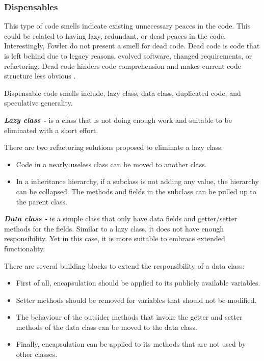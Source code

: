 \subsubsection*{Dispensables}
This type of code smells indicate existing unnecessary peaces in the code. This could be related to having lazy, redundant, or dead peaces in the code. Interestingly, Fowler \cite{fowlerRefactor} do not present a smell for dead code. Dead code is code that is left behind due to legacy reasons, evolved software, changed requirements, or refactoring. Dead code hinders code comprehension and makes current code structure less obvious \cite{mantylaTaxonomy}.

Dispensable code smells include, lazy class, data class, duplicated code, and speculative generality.

\textit{\textbf{Lazy class -}} is a class that is not doing enough work and suitable to be eliminated with a short effort. 

There are two refactoring solutions proposed to eliminate a lazy class:

\begin{itemize}
\item Code in a nearly useless class can be moved to another class. 
\item In a inheritance hierarchy, if a subclass is not adding any value, the hierarchy can be collapsed. The methods and fields in the subclass can be pulled up to the parent class.
\end{itemize}
 
\textit{\textbf{Data class -}} is a simple class that only have data fields and getter/setter methods for the fields. Similar to a lazy class, it does not have enough responsibility. Yet in this case, it is more suitable to embrace extended functionality. 

There are several building blocks to extend the responsibility of a data class:

\begin{itemize}
\item First of all, encapsulation should be applied to its publicly available variables.
\item Setter methods should be removed for variables that should not be modified.
\item The behaviour of the outsider methods that invoke the getter and setter methods of the data class can be moved to the data class.
\item Finally, encapsulation can be applied to its methods that are not used by other classes.
\end{itemize}


